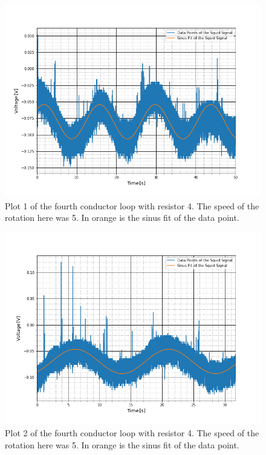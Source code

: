 \begin{figure}[ht]
	\includegraphics[scale=0.5]{Bild/r4_5_1}
	\centering
	\caption[Plot of fourth conductor loop 1]{Plot 1 of the fourth conductor loop with resistor 4. The speed of the rotation here was 5. In orange is the sinus fit of the data point.}
\end{figure}
\begin{figure}[ht]
	\includegraphics[scale=0.5]{Bild/r4_5_2}
	\centering
	\caption[Plot of fourth conductor loop 2]{Plot 2 of the fourth conductor loop with resistor 4. The speed of the rotation here was 5. In orange is the sinus fit of the data point.}
\end{figure}
